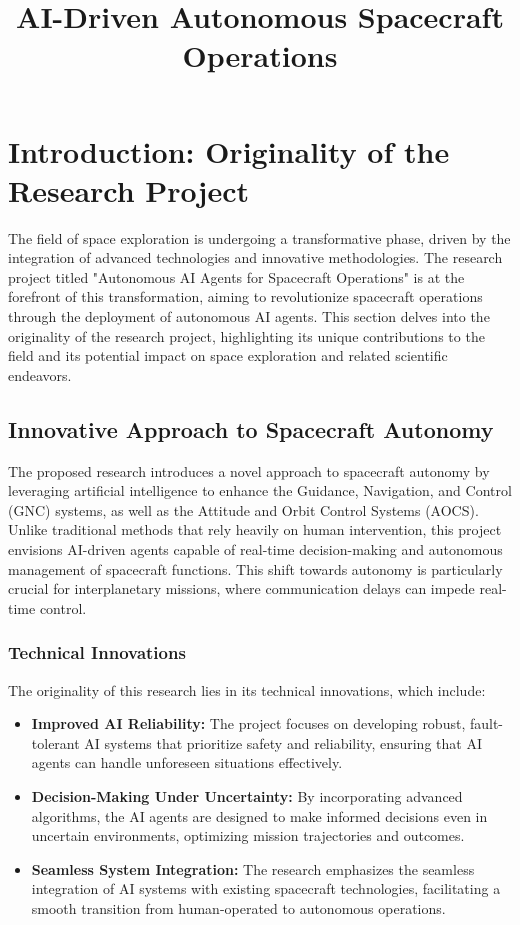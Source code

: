 \documentclass[a4paper,12pt]{article}
\title{AI-Driven Autonomous Spacecraft Operations}
\author{}
\date{}
\begin{document}
\maketitle
\tableofcontents
\newpage

\section{Introduction: Originality of the Research Project}

The field of space exploration is undergoing a transformative phase, driven by the integration of advanced technologies and innovative methodologies. The research project titled "Autonomous AI Agents for Spacecraft Operations" is at the forefront of this transformation, aiming to revolutionize spacecraft operations through the deployment of autonomous AI agents. This section delves into the originality of the research project, highlighting its unique contributions to the field and its potential impact on space exploration and related scientific endeavors.

\subsection{Innovative Approach to Spacecraft Autonomy}

The proposed research introduces a novel approach to spacecraft autonomy by leveraging artificial intelligence to enhance the Guidance, Navigation, and Control (GNC) systems, as well as the Attitude and Orbit Control Systems (AOCS). Unlike traditional methods that rely heavily on human intervention, this project envisions AI-driven agents capable of real-time decision-making and autonomous management of spacecraft functions. This shift towards autonomy is particularly crucial for interplanetary missions, where communication delays can impede real-time control.

\subsubsection{Technical Innovations}

The originality of this research lies in its technical innovations, which include:

\begin{itemize}
    \item \textbf{Improved AI Reliability:} The project focuses on developing robust, fault-tolerant AI systems that prioritize safety and reliability, ensuring that AI agents can handle unforeseen situations effectively.
    \item \textbf{Decision-Making Under Uncertainty:} By incorporating advanced algorithms, the AI agents are designed to make informed decisions even in uncertain environments, optimizing mission trajectories and outcomes.
    \item \textbf{Seamless System Integration:} The research emphasizes the seamless integration of AI systems with existing spacecraft technologies, facilitating a smooth transition from human-operated to autonomous operations.
\end{itemize}
\end{document}
